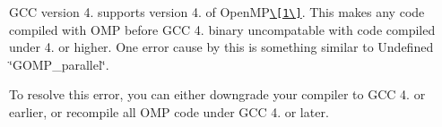 G\-C\-C version 4. supports version 4. of Open\-M\-P\href{https://software.intel.com/en-us/articles/gcc-49-openmp-code-cannot-be-linked-with-intel-openmp-runtime}{\tt \textbackslash{}\mbox{[}1\textbackslash{}\mbox{]}}. This makes any code compiled with O\-M\-P before G\-C\-C 4. binary uncompatable with code compiled under 4. or higher. One error cause by this is something similar to {\ttfamily Undefined \char`\"{}\-G\-O\-M\-P\-\_\-parallel\char`\"{}}.

To resolve this error, you can either downgrade your compiler to G\-C\-C 4. or earlier, or recompile all O\-M\-P code under G\-C\-C 4. or later. 